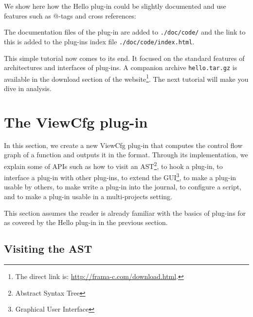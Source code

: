 We show here how the Hello plug-in could be slightly documented and use
\ocamldoc features such as @-tags and cross references:




The documentation files of the plug-in are added to
\texttt{./doc/code/} and the link to this
is added to the plug-ins index file
\texttt{./doc/code/index.html}.

This simple tutorial now comes to its end. It focused on the standard features of
architectures and interfaces of \framac plug-ins. A companion archive
\texttt{hello.tar.gz} is available in the download section of the \framac
website\footnote{The direct link is: \url{http://frama-c.com/download.html}.}.
The next tutorial will make you dive in \C analysis.


\section{The ViewCfg plug-in}\label{tut2:cfg}

In this section, we create a new ViewCfg plug-in that computes the control
flow graph of a function and outputs it in the \dottool format. Through its
implementation, we explain some of \framac APIs such as how to visit
an AST\footnote{Abstract Syntax Tree}, to hook a plug-in, to interface
a plug-in with other plug-ins, to extend the
GUI\footnote{Graphical User Interface}, to make a plug-in usable by
others, to make write a plug-in into the journal, to configure a script,
and to make a plug-in usable in a multi-projects setting.

This section assumes the reader is already familiar with the basics of plug-ins
for \framac as covered by the Hello plug-in in the previous
section.

\subsection{Visiting the AST}\label{tut2:visitor}

